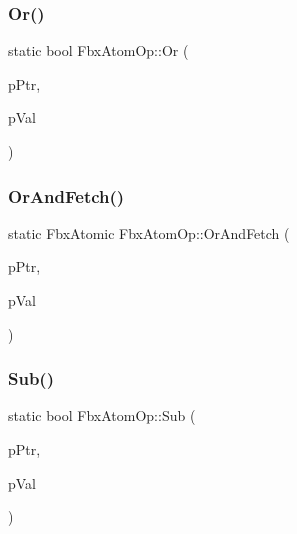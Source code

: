 \mbox{\label{class_fbx_atom_op_ad81d13985005870d9274424b03a5702b}} 
\subsubsection{\texorpdfstring{Or()}{Or()}}
{\footnotesize\ttfamily static bool Fbx\+Atom\+Op\+::\+Or (\begin{DoxyParamCaption}\item[{volatile Fbx\+Atomic $\ast$}]{p\+Ptr,  }\item[{Fbx\+Atomic}]{p\+Val }\end{DoxyParamCaption})\hspace{0.3cm}{\ttfamily [static]}}

\mbox{\label{class_fbx_atom_op_a14bbfad1f361b4154bad77c585d72481}} 
\subsubsection{\texorpdfstring{Or\+And\+Fetch()}{OrAndFetch()}}
{\footnotesize\ttfamily static Fbx\+Atomic Fbx\+Atom\+Op\+::\+Or\+And\+Fetch (\begin{DoxyParamCaption}\item[{volatile Fbx\+Atomic $\ast$}]{p\+Ptr,  }\item[{Fbx\+Atomic}]{p\+Val }\end{DoxyParamCaption})\hspace{0.3cm}{\ttfamily [static]}}

\mbox{\label{class_fbx_atom_op_a9b18f6c0282cd22995b64691a77718c1}} 
\subsubsection{\texorpdfstring{Sub()}{Sub()}}
{\footnotesize\ttfamily static bool Fbx\+Atom\+Op\+::\+Sub (\begin{DoxyParamCaption}\item[{volatile Fbx\+Atomic $\ast$}]{p\+Ptr,  }\item[{Fbx\+Atomic}]{p\+Val }\end{DoxyParamCaption})\hspace{0.3cm}{\ttfamily [static]}}

